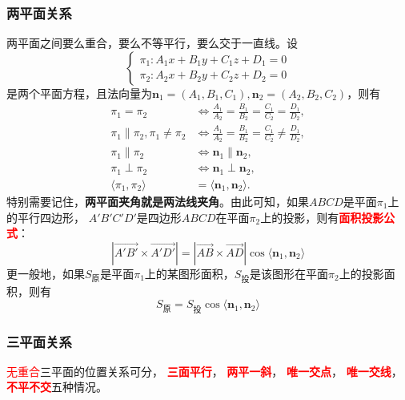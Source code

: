 \subsubsection{两平面关系}
两平面之间要么重合，要么不等平行，要么交于一直线。设
\[
    \begin{cases}
        \pi_1 : A_1x+B_1y+C_1z+D_1=0 \\
        \pi_2 : A_2x+B_2y+C_2z+D_2=0
    \end{cases}
\]
是两个平面方程，且法向量为$\bm{n}_1=(A_1,B_1,C_1),\bm{n}_2=(A_2,B_2,C_2)$，则有
\begin{align*}
    \pi_1 = \pi_2                           & \iff \frac{A_1}{A_2} = \frac{B_1}{B_2} = \frac{C_1}{C_2} = \frac{D_1}{D_2},    \\
    \pi_1 \parallel \pi_2, \pi_1 \neq \pi_2 & \iff \frac{A_1}{A_2} = \frac{B_1}{B_2} = \frac{C_1}{C_2} \neq \frac{D_1}{D_2}, \\
    \pi_1 \parallel \pi_2                   & \iff \bm{n}_1 \parallel \bm{n}_2,                                              \\
    \pi_1 \perp \pi_2                       & \iff \bm{n}_1 \perp \bm{n}_2,                                                  \\
    \langle\pi_1,\pi_2\rangle               & = \langle\bm{n}_1,\bm{n}_2\rangle.
\end{align*}
特别需要记住，\textbf{\textsf{两平面夹角就是两法线夹角}}。由此可知，如果$ABCD$是平面$\pi_1$上的平行四边形，
$A'B'C'D'$是四边形$ABCD$在平面$\pi_2$上的投影，则有\textcolor{red}{\textbf{\textsf{面积投影公式}}}：
\[
    \left\lvert \overrightarrow{A'B'}\times\overrightarrow{A'D'}\right\rvert = \left\lvert \overrightarrow{AB}\times\overrightarrow{AD}\right\rvert\cos\langle\bm{n}_1,\bm{n}_2\rangle
\]
更一般地，如果$S_\text{原}$是平面$\pi_1$上的某图形面积，$S_\text{投}$是该图形在平面$\pi_2$上的投影面积，则有
\begin{equation}
    \label{eq:面积投影公式}
    S_\text{原}  = S_\text{投}\cos\langle\bm{n}_1,\bm{n}_2\rangle
\end{equation}

\subsubsection{三平面关系}
\textcolor{red}{无重合}三平面的位置关系可分，
\textcolor{red}{\textbf{\textsf{三面平行}}}，
\textcolor{red}{\textbf{\textsf{两平一斜}}}，
\textcolor{red}{\textbf{\textsf{唯一交点}}}，
\textcolor{red}{\textbf{\textsf{唯一交线}}}，
\textcolor{red}{\textbf{\textsf{不平不交}}}五种情况。

